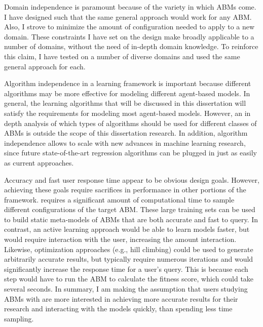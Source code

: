 Domain independence is paramount because of the variety in which ABMs come.
I have designed \fw such that the same general approach would work for any ABM.
Also, I strove to minimize the amount of configuration needed to apply \fw to a new domain.
These constraints I have set on the design make \fw broadly applicable to a number of domains, without the need of in-depth domain knowledge.
To reinforce this claim, I have tested \fw on a number of diverse domains and used the same general approach for each.

Algorithm independence in a learning framework is important because different algorithms may be more effective for modeling different agent-based models.
In general, the learning algorithms that will be discussed in this dissertation will satisfy the requirements for modeling most agent-based models.
However, an in depth analysis of which types of algorithms should be used for different classes of ABMs is outside the scope of this dissertation research.
In addition, algorithm independence allows \fw to scale with new advances in machine learning research, since future state-of-the-art regression algorithms can be plugged in just as easily as current approaches.

Accuracy and fast user response time appear to be obvious design goals.
However, achieving these goals require sacrifices in performance in other portions of the framework.
\fw requires a significant amount of computational time to sample different configurations of the target ABM.
These large training sets can be used to build static meta-models of ABMs that are both accurate and fast to query.
In contrast, an active learning approach would be able to learn models faster, but would require interaction with the user, increasing the amount interaction.
Likewise, optimization approaches (e.g., hill climbing) could be used to generate arbitrarily accurate results, but typically require numerous iterations and would significantly increase the response time for a user's query.
This is because each step would have to run the ABM to calculate the fitness score, which could take several seconds.
In summary, I am making the assumption that users studying ABMs with \fw are more interested in achieving more accurate results for their research and interacting with the models quickly, than spending less time sampling.


